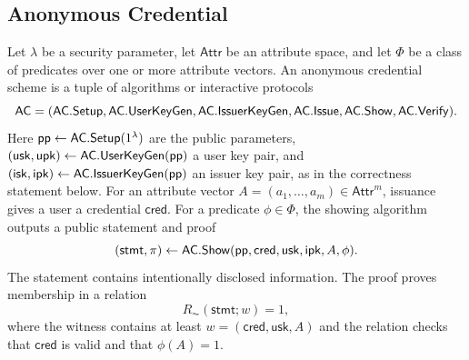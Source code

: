 \subsection{Anonymous Credential}
\begin{definition}
Let $\lambda$ be a security parameter, let $\mathsf{Attr}$ be an attribute space, and let $\Phi$ be a class of predicates over one or more attribute vectors. An anonymous credential scheme is a tuple of algorithms or interactive protocols
\begin{equation*}
  \mathsf{AC}=(\mathsf{AC}.\mathsf{Setup},\mathsf{AC}.\mathsf{UserKeyGen},\mathsf{AC}.\mathsf{IssuerKeyGen},\mathsf{AC}.\mathsf{Issue},\mathsf{AC}.\mathsf{Show},\mathsf{AC}.\mathsf{Verify}).
\end{equation*}
Here $\mathsf{pp}\leftarrow\mathsf{AC}.\mathsf{Setup}(1^\lambda)$ are the public parameters, $(\mathsf{usk},\mathsf{upk})\leftarrow\mathsf{AC}.\mathsf{UserKeyGen}(\mathsf{pp})$ a user key pair, and $(\mathsf{isk},\mathsf{ipk})\leftarrow\mathsf{AC}.\mathsf{IssuerKeyGen}(\mathsf{pp})$ an issuer key pair, as in the correctness statement below.
For an attribute vector $A=(a_1,\ldots,a_m)\in\mathsf{Attr}^m$, issuance gives a user a credential $\mathsf{cred}$. For a predicate $\phi\in\Phi$, the showing algorithm outputs a public statement and proof
\begin{equation*}
  (\mathsf{stmt},\pi)\leftarrow\mathsf{AC}.\mathsf{Show}(\mathsf{pp},\mathsf{cred},\mathsf{usk},\mathsf{ipk},A,\phi).
\end{equation*}
The statement contains intentionally disclosed information. The proof proves membership in a relation
\begin{equation*}
  R_{\AC}(\mathsf{stmt};w)=1,
\end{equation*}
where the witness contains at least $w=(\mathsf{cred},\mathsf{usk},A)$ and the relation checks that $\mathsf{cred}$ is valid and that $\phi(A)=1$.
\end{definition}

